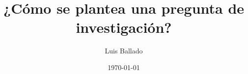 \documentclass[
	11pt, %
]{beamer}
\title[SEMINARIO DE INVESTIGACIÓN I]{¿Cómo se plantea una pregunta de investigación?} %
\author[Luis Ballado]{Luis Ballado} %
\institute[CINVESTAV]{CINVESTAV - UNIDAD TAMAULIPAS \\ \smallskip \textit{luis.ballado@cinvestav.mx}} %
\date[\today]{\today} %
\begin{document}

\begin{frame}
	\titlepage %
\end{frame}



	


\end{document}
